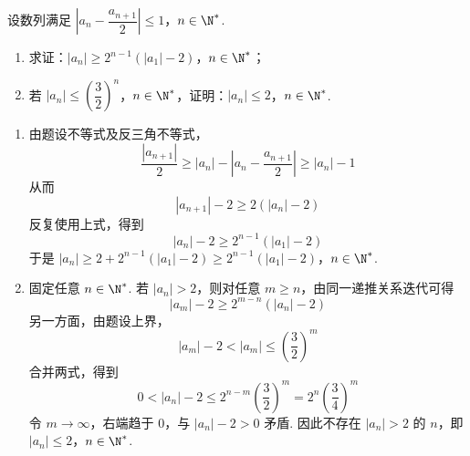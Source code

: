 \begin{problem}
设数列满足 \( \left|a_n-\dfrac{a_{n+1}}{2}\right|\le 1 \)，\( n\in\N^* \).

\begin{enumerate}
\item 求证：\( |a_n|\ge 2^{n-1}\left( |a_1|-2 \right) \)，\( n\in\N^* \)；
\item 若 \( |a_n|\le \left( \dfrac32 \right)^n \)，\( n\in\N^* \)，证明：\( |a_n|\le 2 \)，\( n\in\N^* \).
\end{enumerate}
\end{problem}

\begin{solution}
\begin{enumerate}
\item 由题设不等式及反三角不等式，
\[
\frac{|a_{n+1}|}{2}\geqslant |a_n|-\left|a_n-\frac{a_{n+1}}2\right|\geqslant |a_n|-1
\]
从而
\[
|a_{n+1}|-2\geqslant2(|a_n|-2)
\]
反复使用上式，得到
\[
|a_n|-2\geqslant2^{n-1}(|a_1|-2)
\]
于是
\(|a_n|\geqslant2+2^{n-1}(|a_1|-2) \geqslant2^{n-1}(|a_1|-2)\)，\(n\in\N^*\).

\item 固定任意 \(n\in\N^*\). 若 \(|a_n|>2\)，则对任意 \(m\geqslant n\)，由同一递推关系迭代可得
\[
|a_m|-2\geqslant2^{m-n}(|a_n|-2)
\]
另一方面，由题设上界，
\[
|a_m|-2<|a_m|\leqslant\left(\frac32\right)^m
\]
合并两式，得到
\[
0<|a_n|-2\leqslant2^{n-m}\left(\frac32\right)^m
=2^n\left(\frac34\right)^m
\]
令 \(m\to\infty\)，右端趋于 \(0\)，与 \(|a_n|-2>0\) 矛盾. 因此不存在 \(|a_n|>2\) 的 \(n\)，即
\(|a_n|\leqslant2\)，\(n\in\N^*\).
\end{enumerate}
\end{solution}
